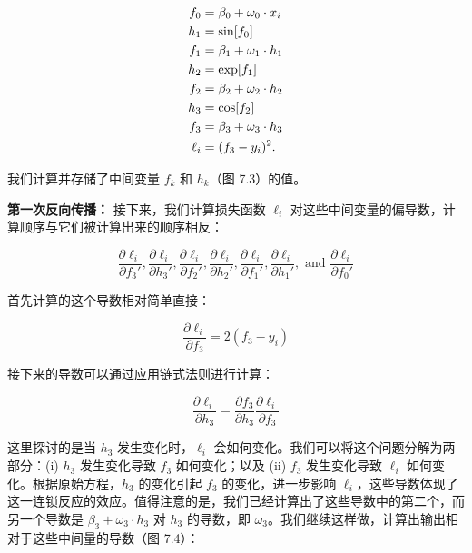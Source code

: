 \documentclass[lang=cn,newtx,10pt,scheme=chinese]{elegantbook}
\begin{document}
\begin{align}
f_0 &= \beta_0 + \omega_0 \cdot x_i \notag \\
h_1 &= \sin[f_0] \notag \\
f_1 &= \beta_1 + \omega_1 \cdot h_1 \notag \\
h_2 &= \exp[f_1] \notag \\
f_2 &= \beta_2 + \omega_2 \cdot h_2 \notag \\
h_3 &= \cos[f_2] \notag \\
f_3 &= \beta_3 + \omega_3 \cdot h_3 \notag \\
\ell_i &= (f_3 - y_i)^2. 
\end{align} 


我们计算并存储了中间变量 \(f_k\) 和 \(h_k\)（图 7.3）的值。


\textbf{第一次反向传播：} 接下来，我们计算损失函数 \(\ell_i\) 对这些中间变量的偏导数，计算顺序与它们被计算出来的顺序相反：


\begin{equation}
\frac{\partial \ell_i}{\partial f_3'}, \frac{\partial \ell_i}{\partial h_3'}, \frac{\partial \ell_i}{\partial f_2'}, \frac{\partial \ell_i}{\partial h_2'}, \frac{\partial \ell_i}{\partial f_1'}, \frac{\partial \ell_i}{\partial h_1'}, \text{ and } \frac{\partial \ell_i}{\partial f_0'} 
\end{equation}

首先计算的这个导数相对简单直接：

\begin{equation}
\frac{\partial \ell_i}{\partial f_3} = 2(f_3 - y_i) 
\end{equation}


接下来的导数可以通过应用链式法则进行计算：

\begin{equation}
\frac{\partial \ell_i}{\partial h_3} = \frac{\partial f_3}{\partial h_3} \frac{\partial \ell_i}{\partial f_3} 
\end{equation}

这里探讨的是当 \(h_3\) 发生变化时，\(\ell_i\) 会如何变化。我们可以将这个问题分解为两部分：(i) \(h_3\) 发生变化导致 \(f_3\) 如何变化；以及 (ii) \(f_3\) 发生变化导致 \(\ell_i\) 如何变化。根据原始方程，\(h_3\) 的变化引起 \(f_3\) 的变化，进一步影响 \(\ell_i\)，这些导数体现了这一连锁反应的效应。值得注意的是，我们已经计算出了这些导数中的第二个，而另一个导数是 \(\beta_3 + \omega_3 \cdot h_3\) 对 \(h_3\) 的导数，即 \(\omega_3\)。我们继续这样做，计算出输出相对于这些中间量的导数（图 7.4）：
\end{document}
